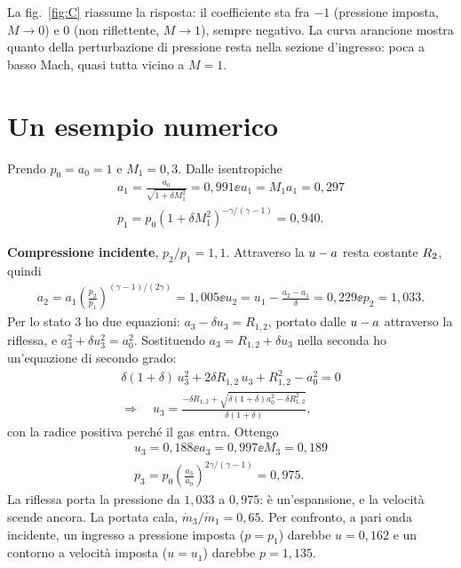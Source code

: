 
La fig.~\ref{fig:C} riassume la risposta: il coefficiente sta fra $-1$ (pressione imposta, $M\to0$) e $0$ (non
riflettente, $M\to1$), sempre negativo. La curva arancione mostra quanto della perturbazione di pressione resta nella
sezione d'ingresso: poca a basso Mach, quasi tutta vicino a $M=1$.

\section*{Un esempio numerico}
Prendo $p_0=a_0=1$ e $M_1=0{,}3$. Dalle isentropiche
\begin{gather*}
  a_1=\frac{a_0}{\sqrt{1+\delta M_1^2}}=0{,}991 \ee u_1=M_1a_1=0{,}297 \\
  p_1=p_0\left(1+\delta M_1^2\right)^{-\gamma/(\gamma-1)}=0{,}940 .
\end{gather*}

\textbf{Compressione incidente}, $p_2/p_1=1{,}1$. Attraverso la $u-a$ resta costante $R_2$, quindi
\begin{gather*}
  a_2=a_1\left(\frac{p_2}{p_1}\right)^{(\gamma-1)/(2\gamma)}=1{,}005 \ee
  u_2=u_1-\frac{a_2-a_1}{\delta}=0{,}229 \ee p_2=1{,}033 .
\end{gather*}
Per lo stato 3 ho due equazioni: $a_3-\delta u_3=R_{1,2}$, portato dalle $u-a$ attraverso la riflessa, e
$a_3^2+\delta u_3^2=a_0^2$. Sostituendo $a_3=R_{1,2}+\delta u_3$ nella seconda ho un'equazione di secondo grado:
\begin{gather*}
  \delta(1+\delta)\,u_3^2+2\delta R_{1,2}\,u_3+R_{1,2}^2-a_0^2=0 \\
  \Longrightarrow\quad u_3=\frac{-\delta R_{1,2}+\sqrt{\delta(1+\delta)a_0^2-\delta R_{1,2}^2}}{\delta(1+\delta)} ,
\end{gather*}
con la radice positiva perché il gas entra. Ottengo
\begin{gather*}
  u_3=0{,}188 \ee a_3=0{,}997 \ee M_3=0{,}189 \\
  p_3=p_0\left(\frac{a_3}{a_0}\right)^{2\gamma/(\gamma-1)}=0{,}975 .
\end{gather*}
La riflessa porta la pressione da $1{,}033$ a $0{,}975$: è un'espansione, e la velocità scende ancora. La portata
cala, $\dot m_3/\dot m_1=0{,}65$. Per confronto, a pari onda incidente, un ingresso a pressione imposta ($p=p_1$)
darebbe $u=0{,}162$ e un contorno a velocità imposta ($u=u_1$) darebbe $p=1{,}135$.

